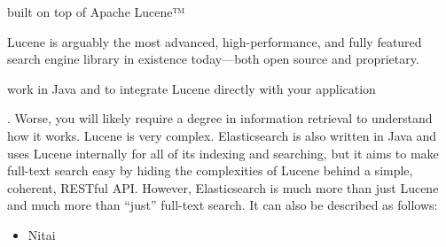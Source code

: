 
built on top of Apache Lucene™

Lucene is arguably the most advanced, high-performance, and fully featured search engine library in existence today—both open source and proprietary.

work in Java and to integrate Lucene directly with your application

. Worse, you will likely require a degree in information retrieval to understand how it works. Lucene is very complex.  Elasticsearch is also written in Java and uses Lucene internally for all of its indexing and searching, but it aims to make full-text search easy by hiding the complexities of Lucene behind a simple, coherent, RESTful API.  However, Elasticsearch is much more than just Lucene and much more than “just” full-text search. It can also be described as follows:
\begin{itemize}
	\item Nitai
\end{itemize}
